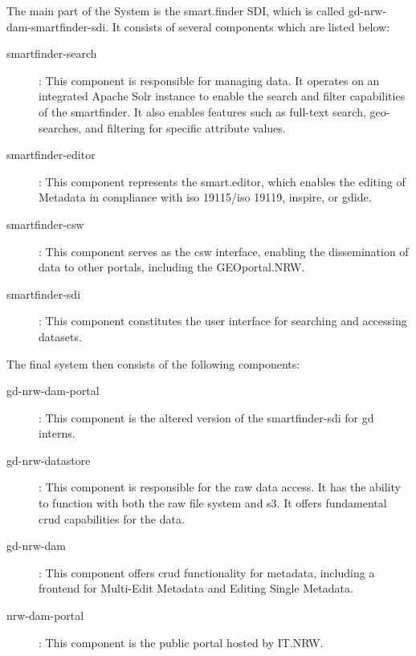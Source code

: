 \documentclass[11pt, titlepage, a4paper]{article}
\begin{document}
The main part of the System is the smart.finder SDI, which is called gd-nrw-dam-smartfinder-sdi. It consists of several components which are listed below:
\begin{description}
    \item[smartfinder-search]: This component is responsible for managing data. It operates on an integrated Apache Solr instance to enable the search and filter capabilities of the smartfinder. It also enables features such as full-text search, geo-searches, and filtering for specific attribute values.
    \item[smartfinder-editor]: This component represents the smart.editor, which enables the editing of Metadata in compliance with \gls{iso} 19115/\gls{iso} 19119, \gls{inspire}, or \gls{gdide}.
    \item[smartfinder-csw]: This component serves as the \gls{csw} interface, enabling the dissemination of data to other portals, including the GEOportal.NRW.
    \item[smartfinder-sdi]: This component constitutes the user interface for searching and accessing datasets.

\end{description}
The final system then consists of the following components:
\begin{description}
    \item[gd-nrw-dam-portal]: This component is the altered version of the smartfinder-sdi for \gls{gd} interns.
    \item[gd-nrw-datastore]: This component is responsible for the raw data access. It has the ability to function with both the raw file system and \gls{s3}. It offers fundamental \gls{crud} capabilities for the data.
    \item[gd-nrw-dam]:  This component offers \gls{crud} functionality for metadata, including a frontend for Multi-Edit Metadata and Editing Single Metadata. %
    \item[nrw-dam-portal]: This component is the public portal hosted by IT.NRW.

\end{description}
\end{document}
